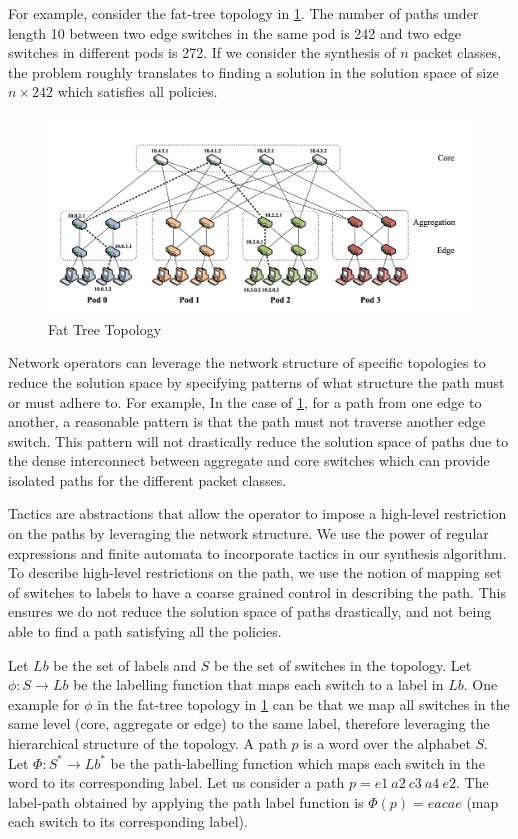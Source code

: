 \documentclass[]{sig}
\begin{document}
For example, consider the fat-tree topology in \cref{fattree}. The number of paths under length 10 between two edge  switches in the same pod is 242 and two edge switches in different pods is 272. If we consider the synthesis of $n$ packet classes, the problem roughly translates to finding a solution in the solution space of size $n \times 242$ which satisfies all policies. 
\begin{figure}[H]
	\includegraphics[width=\columnwidth]{fattree.png}
	\caption{Fat Tree Topology}
	\label{fattree}
\end{figure}
Network operators can leverage the network structure of specific topologies to reduce the solution space by specifying patterns of what structure the path must or must adhere to. For example, In the case of \cref{fattree}, for a path from one edge to another, a reasonable pattern is that the path must not traverse another edge switch. This pattern will not drastically reduce the solution space of paths due to the dense interconnect between aggregate and core switches which can provide isolated paths for the different packet classes. 

Tactics are abstractions that allow the operator to impose a high-level restriction on the paths by leveraging the network structure. We use the power of regular expressions and finite automata to incorporate tactics in our synthesis algorithm. To describe high-level restrictions on the path, we use the notion of mapping set of switches to labels to have a coarse grained control in describing the path. This ensures we do not reduce the solution space of paths drastically, and not being able to find a path satisfying all the policies.

 Let $Lb$ be the set of labels and $S$ be the set of switches in the topology. Let $\phi : S \rightarrow Lb$ be the labelling function that maps each switch to a label in $Lb$. One example for $\phi$ in the fat-tree topology in \cref{fattree} can be that we map all switches in the same level (core, aggregate or edge) to the same label,
therefore leveraging the hierarchical structure of the topology. A path $p$ is a word over the alphabet $S$. Let $\Phi : S^* \rightarrow Lb^*$ be the path-labelling function which maps each switch in the word to its corresponding label. Let us consider a path $p = e1\ a2\ c3\ a4\ e2$. The label-path obtained by applying the path label function is $\Phi(p) = eacae$ (map each switch to its corresponding label).
\end{document}
